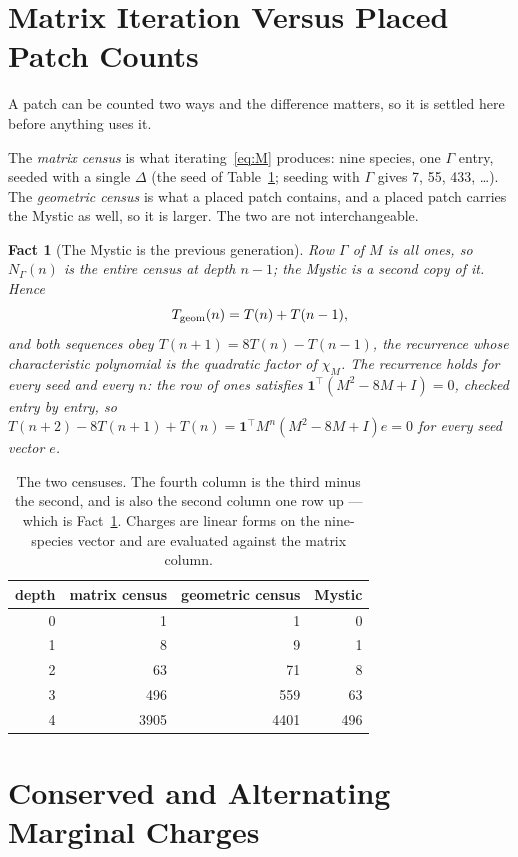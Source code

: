 \documentclass[11pt]{article}
\newtheorem{fact}{Fact}
\theoremstyle{definition}
\theoremstyle{remark}
\begin{document}
\section{Matrix Iteration Versus Placed Patch Counts}
\label{sec:census}

A patch can be counted two ways and the difference matters, so it is settled
here before anything uses it.

The \emph{matrix census} is what iterating~\eqref{eq:M} produces: nine species,
one $\Gamma$ entry, seeded with a single $\Delta$ (the seed of Table~\ref{tab:census}; seeding with $\Gamma$ gives 7, 55,
433, \dots).  The \emph{geometric census} is what a placed patch
contains, and a placed patch carries the Mystic as well, so it is larger.  The
two are not interchangeable.

\begin{fact}[The Mystic is the previous generation]
\label{fact:mystic}
Row $\Gamma$ of $M$ is all ones, so $N_\Gamma(n)$ is the entire census at depth
$n-1$; the Mystic is a second copy of it.  Hence
\[
T_{\rm geom}(n)=T(n)+T(n-1),
\]
and both sequences obey $T(n{+}1)=8T(n)-T(n{-}1)$, the recurrence whose
characteristic polynomial is the quadratic factor of $\chi_M$.  The recurrence holds for
every seed and every $n$: the row of ones satisfies $\mathbf{1}^{\top}(M^{2}-8M+I)=0$, checked
entry by entry, so $T(n{+}2)-8T(n{+}1)+T(n)=\mathbf{1}^{\top}M^{n}(M^{2}-8M+I)e=0$ for every seed
vector $e$.
\end{fact}

\begin{table}[h]
\centering
\begin{tabular}{rrrr}
\toprule
depth & matrix census & geometric census & Mystic \\
\midrule
0 & 1 & 1 & 0 \\
1 & 8 & 9 & 1 \\
2 & 63 & 71 & 8 \\
3 & 496 & 559 & 63 \\
4 & 3905 & 4401 & 496 \\
\bottomrule
\end{tabular}
\caption{The two censuses. The fourth column is the third minus the second,
and is also the second column one row up --- which is Fact~\ref{fact:mystic}.
Charges are linear forms on the nine-species vector and are evaluated against
the matrix column.}
\label{tab:census}
\end{table}


\section{Conserved and Alternating Marginal Charges}
\label{sec:charges}
\end{document}

